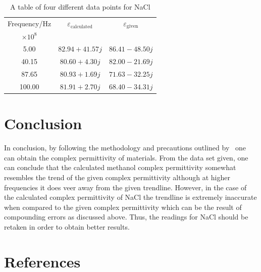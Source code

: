 \documentclass[12pt, a4paper]{article}
\begin{document}
\begin{table}[H]
    \centering
    \begin{tabular}{ccc}
    \hline
    Frequency/Hz &
      \(\varepsilon_{\mathrm{calculated}}\) &
      \(\varepsilon_{\mathrm{given}}\) \\
      \(\times 10^8\)& & \\ \hline \hline
      5.00   & \(82.94+41.57j\) & \(86.41-48.50j\) \\
      40.15  & \(80.60+4.30j\)  & \(82.00-21.69j\) \\
      87.65  & \(80.93+1.69j\)  & \(71.63-32.25j\) \\
      100.00 & \(81.91+2.70j\)  & \(68.40-34.31j\) \\ \hline
    \end{tabular}
    \caption{A table of four different data points for NaCl}\label{tab: Table 2}
\end{table}

\section{Conclusion}
In conclusion, by following the methodology and precautions outlined by~\cite{marsland1987dielectric} one can obtain the complex permittivity of materials. From the data set given, one can conclude that the calculated methanol complex permittivity somewhat resembles the trend of the given complex permittivity although at higher frequencies it does veer away from the given trendline. However, in the case of the calculated complex permittivity of NaCl the trendline is extremely inaccurate when compared to the given complex permittivity which can be the result of compounding errors as discussed above. Thus, the readings for NaCl should be retaken in order to obtain better results.

\section{References}
\printbibliography[heading = none]
\end{document}
